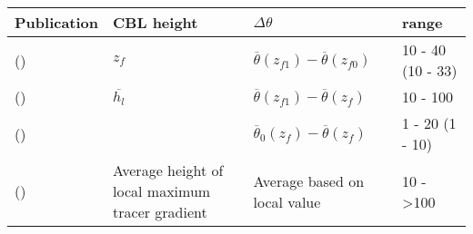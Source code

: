 \begin{table}[htbp]
\begin{center}
\begin{tabular}{ p{5cm} p{2cm} p{2cm} p{2cm}}
Publication & \acs{CBL} height & $\Delta \theta$ & range\\ \hline
\citeauthor{FedConzMir04} (\citeyear{FedConzMir04}) & $z_{f}$ & $\overline{\theta}(z_{f1}) - \overline{\theta}(z_{f0})$ & 10 - 40 (10 - 33)\\ [.3cm] %
\citeauthor{SullMoengStev} (\citeyear{SullMoengStev}) & $\overline{h_{l}}$ & $\overline{\theta}(z_{f1}) - \overline{\theta}(z_{f})$ & 10 - 100\\ \hline
\citeauthor{FedConzMir04} (\citeyear{FedConzMir04}) & & $\overline{\theta}_{0}(z_{f}) - \overline{\theta}(z_{f})$ & 1 - 20 (1 - 10)\\ [.3cm] %
\citeauthor{BrooksFowler2} (\citeyear{BrooksFowler2}) & Average height of local maximum tracer gradient & Average based on local value &10 - >100\\ \hline
\end{tabular}
\end{center}    
\end{table}



\FloatBarrier


\endinput

Any text after an \endinput is ignored.
You could put scraps here or things in progress.
